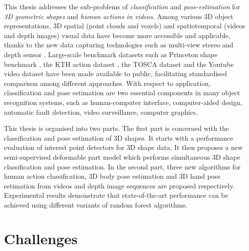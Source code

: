 This thesis addresses the sub-problems of \emph{classification} and \emph{pose-estimation} for \emph{3D geometric shapes} and \emph{human actions in videos}. 
Among various 3D object representations, 3D spatial (\eg point clouds and voxels) and spatiotemporal (\eg videos and depth images) visual data have become more accessible and applicable, thanks to the new data capturing technologies such as multi-view stereo \cite{Vogiatzis2011} and depth sensor \cite{Shotton2011}.  
Large-scale benchmark datasets such as Princeton shape benchmark \cite{Shilane2004}, the KTH action dataset \cite{Schuldt2004}, the TOSCA dataset \cite{Bronstein2011} and the Youtube video dataset \cite{Liu2009} have been made available to public, facilitating standardised comparison among different approaches.
With respect to application, classification and pose estimation are two essential components in many object recognition systems, such as human-computer interface, computer-aided design, automatic fault detection, video surveillance, computer graphics. 

This thesis is organised into two parts.  
The first part is concerned with the classification and pose estimation of 3D shapes. 
It starts with a performance evaluation of interest point detectors for 3D shape data. 
It then proposes a new semi-supervised deformable part model which performs simultaneous 3D shape classification and pose estimation. 
In the second part, three new algorithms for human action classification, 3D body pose estimation and 3D hand pose estimation from videos and depth image sequences are proposed respectively. Experimental results demonstrate that state-of-the-art performance can be achieved using different variants of random forest algorithms.  

\section{Challenges}

